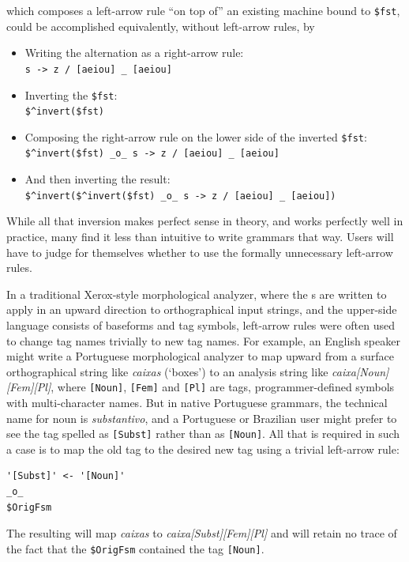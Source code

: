 \noindent
which composes a left-arrow rule ``on top of'' an existing machine bound to \verb!$fst!,
could be accomplished equivalently, without left-arrow rules, by 

\begin{itemize}
\item
Writing the alternation as a right-arrow rule:\\\verb!s -> z / [aeiou] _ [aeiou]!
\item
Inverting the \verb!$fst!:\\  \verb!$^invert($fst)!
\item
Composing the right-arrow rule on the lower side of the inverted
\verb!$fst!:\\
\verb!$^invert($fst) _o_ s -> z / [aeiou] _ [aeiou]!
\item
And then inverting the result:\\ 
\verb!$^invert($^invert($fst) _o_ s -> z / [aeiou] _ [aeiou])!
\end{itemize}


\noindent 
While all that inversion makes perfect sense in theory, and works
perfectly well in practice,
many find it less than intuitive to write grammars that way.
Users will have to judge for themselves whether to use
the formally unnecessary left-arrow rules.

In a traditional Xerox-style morphological analyzer, where the
\fst{}s are written to apply in an upward direction to
orthographical input strings, and the upper-side language consists of
baseforms and tag symbols,  left-arrow rules were often used to change
tag names trivially to new tag names.  For example, an English speaker
might write a Portuguese morphological analyzer to map upward from a
surface orthographical string like \emph{caixas} (`boxes') to an
analysis string like \emph{caixa[Noun][Fem][Pl]}, where \texttt{[Noun]},
\texttt{[Fem]} and \texttt{[Pl]} are tags,  programmer-defined symbols with
multi-character names.  But in native Portuguese grammars, the technical
name for noun is \emph{substantivo}, and a Portuguese or Brazilian user
might prefer to see the tag spelled as \texttt{[Subst]} rather than as
\texttt{[Noun]}.  All that is required in such a case is to map the old
tag to the desired new tag using a trivial left-arrow rule:

\begin{Verbatim}
'[Subst]' <- '[Noun]'
_o_
$OrigFsm
\end{Verbatim}

\noindent
The resulting \fsm{} will map \emph{caixas} to
\emph{caixa[Subst][Fem][Pl]} and will retain no trace of the fact that 
the \texttt{\$OrigFsm} contained the tag \texttt{[Noun]}.

